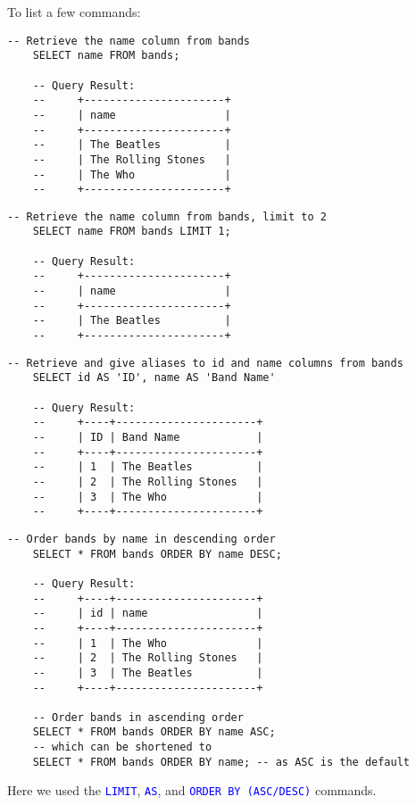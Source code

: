 \noindent
To list a few commands:
\begin{lstlisting}[style=sql]
    -- Retrieve the name column from bands
    SELECT name FROM bands;

    -- Query Result:
    --     +----------------------+
    --     | name                 |
    --     +----------------------+
    --     | The Beatles          |
    --     | The Rolling Stones   |
    --     | The Who              |
    --     +----------------------+
\end{lstlisting}
\begin{lstlisting}[style=sql]
    -- Retrieve the name column from bands, limit to 2
    SELECT name FROM bands LIMIT 1;

    -- Query Result:
    --     +----------------------+
    --     | name                 |
    --     +----------------------+
    --     | The Beatles          |
    --     +----------------------+
\end{lstlisting}
\begin{lstlisting}[style=sql]
    -- Retrieve and give aliases to id and name columns from bands
    SELECT id AS 'ID', name AS 'Band Name'

    -- Query Result:
    --     +----+----------------------+
    --     | ID | Band Name            |
    --     +----+----------------------+
    --     | 1  | The Beatles          |
    --     | 2  | The Rolling Stones   |
    --     | 3  | The Who              |
    --     +----+----------------------+
\end{lstlisting}
\begin{lstlisting}[style=sql]
    -- Order bands by name in descending order
    SELECT * FROM bands ORDER BY name DESC;

    -- Query Result:
    --     +----+----------------------+
    --     | id | name                 |
    --     +----+----------------------+
    --     | 1  | The Who              |
    --     | 2  | The Rolling Stones   |
    --     | 3  | The Beatles          |
    --     +----+----------------------+

    -- Order bands in ascending order
    SELECT * FROM bands ORDER BY name ASC;
    -- which can be shortened to 
    SELECT * FROM bands ORDER BY name; -- as ASC is the default
\end{lstlisting}

\noindent
Here we used the \textcolor{blue}{\texttt{LIMIT}}, \textcolor{blue}{\texttt{AS}}, and \textcolor{blue}{\texttt{ORDER BY (ASC/DESC)}} commands.

